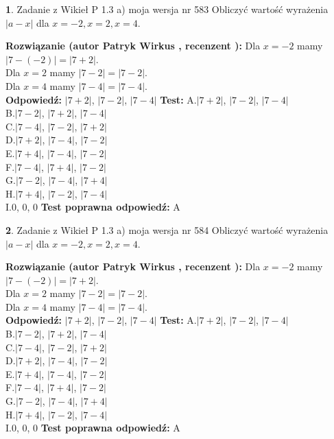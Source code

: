 \documentclass[12pt, a4paper]{article}
\theoremstyle{definition} %
\newtheorem{zad}{}
\newcommand{\zadStart}[1]{\begin{zad}#1\newline}
\newcommand{\zadStop}{\end{zad}}
\newcommand{\rozwStart}[2]{\noindent \textbf{Rozwiązanie (autor #1 , recenzent #2): }\newline}
\newcommand{\rozwStop}{\newline}
\newcommand{\odpStart}{\noindent \textbf{Odpowiedź:}\newline}
\newcommand{\odpStop}{\newline}
\newcommand{\testStart}{\noindent \textbf{Test:}\newline}
\newcommand{\testStop}{\newline}
\newcommand{\kluczStart}{\noindent \textbf{Test poprawna odpowiedź:}\newline}
\newcommand{\kluczStop}{\newline}
\begin{document}
\zadStart{Zadanie z Wikieł P 1.3 a) moja wersja nr 583}
Obliczyć wartość wyrażenia $|a - x|$ dla $x=-2,x=2,x=4$.
\zadStop
\rozwStart{Patryk Wirkus}{}
Dla $x = -2$ mamy $|7 - (-2)| = |7 + 2|$.\\
Dla $x = 2$ mamy $|7 - 2| = |7 - 2|$.\\
Dla $x = 4$ mamy $|7 - 4| = |7 - 4|$.\\
\rozwStop
\odpStart
$|7 + 2|$, $|7 - 2|$, $|7 - 4|$
\odpStop
\testStart
A.$|7 + 2|$, $|7 - 2|$, $|7 - 4|$\\
B.$|7 - 2|$, $|7 + 2|$, $|7 - 4|$\\
C.$|7 - 4|$, $|7 - 2|$, $|7 + 2|$\\
D.$|7 + 2|$, $|7 - 4|$, $|7 - 2|$\\
E.$|7 + 4|$, $|7 - 4|$, $|7 - 2|$\\
F.$|7 - 4|$, $|7 + 4|$, $|7 - 2|$\\
G.$|7 - 2|$, $|7 - 4|$, $|7 + 4|$\\
H.$|7 + 4|$, $|7 - 2|$, $|7 - 4|$\\
I.$0$, $0$, $0$
\testStop
\kluczStart
A
\kluczStop



\zadStart{Zadanie z Wikieł P 1.3 a) moja wersja nr 584}
Obliczyć wartość wyrażenia $|a - x|$ dla $x=-2,x=2,x=4$.
\zadStop
\rozwStart{Patryk Wirkus}{}
Dla $x = -2$ mamy $|7 - (-2)| = |7 + 2|$.\\
Dla $x = 2$ mamy $|7 - 2| = |7 - 2|$.\\
Dla $x = 4$ mamy $|7 - 4| = |7 - 4|$.\\
\rozwStop
\odpStart
$|7 + 2|$, $|7 - 2|$, $|7 - 4|$
\odpStop
\testStart
A.$|7 + 2|$, $|7 - 2|$, $|7 - 4|$\\
B.$|7 - 2|$, $|7 + 2|$, $|7 - 4|$\\
C.$|7 - 4|$, $|7 - 2|$, $|7 + 2|$\\
D.$|7 + 2|$, $|7 - 4|$, $|7 - 2|$\\
E.$|7 + 4|$, $|7 - 4|$, $|7 - 2|$\\
F.$|7 - 4|$, $|7 + 4|$, $|7 - 2|$\\
G.$|7 - 2|$, $|7 - 4|$, $|7 + 4|$\\
H.$|7 + 4|$, $|7 - 2|$, $|7 - 4|$\\
I.$0$, $0$, $0$
\testStop
\kluczStart
A
\kluczStop
\end{document}
